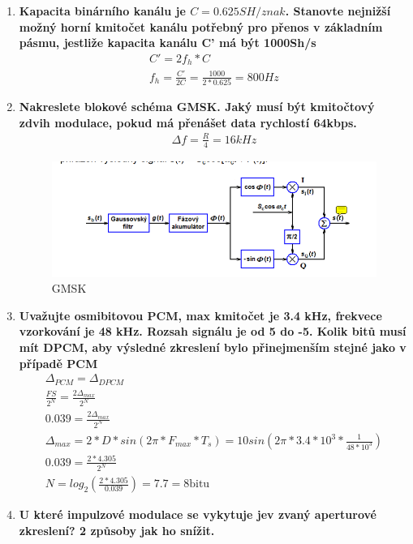 \begin{enumerate}
    \item \textbf{Kapacita binárního kanálu je $C=0.625 SH/znak$. Stanovte nejnižší možný horní kmitočet kanálu potřebný pro přenos v základním pásmu, jestliže kapacita kanálu C' má být 1000Sh/s}
    \begin{gather*}
        C'=2f_h*C \\
        f_h=\frac{C'}{2C}=\frac{1000}{2*0.625}=800 Hz
    \end{gather*}
    \item \textbf{Nakreslete blokové schéma GMSK. Jaký musí být kmitočtový zdvih modulace, pokud má přenášet data rychlostí 64kbps.}
    \begin{gather*}
        \Delta f= \frac{R}{4}=16 kHz
    \end{gather*}
    \begin{figure}[h!]
        \centering
        \includegraphics[scale=0.7]{images/GMSK.png}
        \caption{GMSK}
        \label{fig:enter-label}
    \end{figure}

    \item \textbf{Uvažujte osmibitovou PCM, max kmitočet je 3.4 kHz, frekvece vzorkování je 48 kHz. Rozsah signálu je od 5 do -5. Kolik bitů musí mít DPCM, aby výsledné zkreslení bylo přinejmenším stejné jako v případě PCM}
    \begin{gather*}
        \Delta_{PCM}=\Delta_{DPCM}\\
        \frac{FS}{2^N}=\frac{2\Delta_{max}}{2^N}\\
        0.039=\frac{2\Delta_{max}}{2^N}\\
        \Delta_{max}=2*D*sin(2\pi*F_{max}*T_s)=10sin(2\pi*3.4*10^3*\frac{1}{48*10^3})\\
        0.039=\frac{2*4.305}{2^N}\\
        N=log_2(\frac{2*4.305}{0.039})=7.7=8 \textrm{bitu}
    \end{gather*}

    \item \textbf{U které impulzové modulace se vykytuje jev zvaný aperturové zkreslení? 2 způsoby jak ho snížit.}
    

\end{enumerate}
